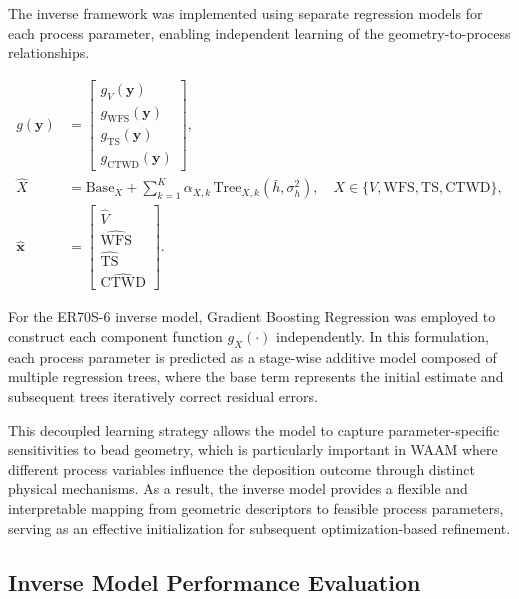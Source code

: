 \documentclass[11pt]{article}
\begin{document}
The inverse framework was implemented using separate regression models for each process parameter, enabling independent learning of the geometry-to-process relationships.

\begin{tcolorbox}[colback=white,colframe=black,boxrule=0.5pt,arc=2pt]
\begin{equation}
\begin{aligned}
g(\mathbf{y}) &=
\begin{bmatrix}
g_{V}(\mathbf{y}) \\
g_{\mathrm{WFS}}(\mathbf{y}) \\
g_{\mathrm{TS}}(\mathbf{y}) \\
g_{\mathrm{CTWD}}(\mathbf{y})
\end{bmatrix}, \\
\hat{X} &= \mathrm{Base}_{X}
+ \sum_{k=1}^{K}
\alpha_{X,k}\,
\mathrm{Tree}_{X,k}\left(\bar{h},\sigma_h^2\right), \quad
X \in \{V,\mathrm{WFS},\mathrm{TS},\mathrm{CTWD}\}, \\
\hat{\mathbf{x}} &=
\begin{bmatrix}
\hat{V} \\
\widehat{\mathrm{WFS}} \\
\widehat{\mathrm{TS}} \\
\widehat{\mathrm{CTWD}}
\end{bmatrix}.
\end{aligned}
\end{equation}
\end{tcolorbox}

For the ER70S-6 inverse model, Gradient Boosting Regression was employed to construct each component function $g_X(\cdot)$ independently. In this formulation, each process parameter is predicted as a stage-wise additive model composed of multiple regression trees, where the base term represents the initial estimate and subsequent trees iteratively correct residual errors.

This decoupled learning strategy allows the model to capture parameter-specific sensitivities to bead geometry, which is particularly important in WAAM where different process variables influence the deposition outcome through distinct physical mechanisms. As a result, the inverse model provides a flexible and interpretable mapping from geometric descriptors to feasible process parameters, serving as an effective initialization for subsequent optimization-based refinement.

\subsection{Inverse Model Performance Evaluation}
\end{document}
